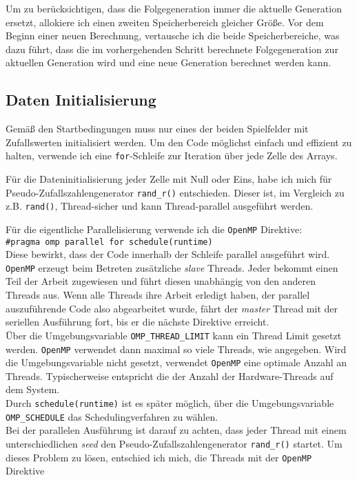 \documentclass[german,plainarticle,hyperref,utf8]{zihpub}
\begin{document}
	Um zu berücksichtigen, dass die Folgegeneration immer die aktuelle Generation ersetzt, allokiere ich einen zweiten Speicherbereich gleicher Größe. Vor dem Beginn einer neuen Berechnung, vertausche ich die beide Speicherbereiche, was dazu führt, dass die im vorhergehenden Schritt berechnete Folgegeneration zur aktuellen Generation wird und eine neue Generation berechnet werden kann.
	
	\subsection{Daten Initialisierung}
	Gemäß den Startbedingungen muss nur eines der beiden Spielfelder mit Zufallswerten initialisiert werden.
	Um den Code möglichst einfach und effizient zu halten, verwende ich eine \texttt{for}-Schleife zur Iteration über jede Zelle des Arrays.
	
	Für die Dateninitialisierung jeder Zelle mit Null oder Eins, habe ich mich für Pseudo-Zufallszahlengenerator \texttt{rand\_r()} entschieden. Dieser ist, im Vergleich zu z.B. \texttt{rand()}, Thread-sicher und kann Thread-parallel ausgeführt werden.
	
	Für die eigentliche Parallelisierung verwende ich die \texttt{OpenMP} Direktive:\\
	
	\texttt{\#pragma omp parallel for schedule(runtime)}\\
	
	Diese bewirkt, dass der Code innerhalb der Schleife parallel ausgeführt wird. \texttt{OpenMP} erzeugt beim Betreten zusätzliche \textit{slave} Threads. Jeder bekommt einen Teil der Arbeit zugewiesen und führt diesen unabhängig von den anderen Threads aus. Wenn alle Threads ihre Arbeit erledigt haben, der parallel auszuführende Code also abgearbeitet wurde, fährt der \textit{master} Thread mit der seriellen Ausführung fort, bis er die nächste Direktive erreicht.\\
	Über die Umgebungsvariable \texttt{OMP\_THREAD\_LIMIT} kann ein Thread Limit gesetzt werden. \texttt{OpenMP} verwendet dann maximal so viele Threads, wie angegeben. Wird die Umgebungsvariable nicht gesetzt, verwendet \texttt{OpenMP} eine optimale Anzahl an Threads. Typischerweise entspricht die der Anzahl der Hardware-Threads auf dem System.\\
	Durch \texttt{schedule(runtime)} ist es später möglich, über die Umgebungsvariable \texttt{OMP\_SCHEDULE} das Schedulingverfahren zu wählen.\\
	Bei der parallelen Ausführung ist darauf zu achten, dass jeder Thread mit einem unterschiedlichen \textit{seed} den Pseudo-Zufallszahlengenerator \texttt{rand\_r()} startet. Um dieses Problem zu lösen, entschied ich mich, die Threads mit der \texttt{OpenMP} Direktive \\
	
\end{document}

